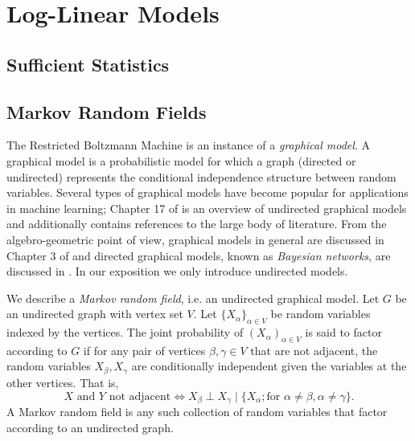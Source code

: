 \documentclass[cclicense]{hmcthesis}
\numberwithin{equation}{chapter}
\numberwithin{thmcounter}{chapter}
\begin{document}



\chapter{Log-Linear Models}

\section{Sufficient Statistics}

\section{Markov Random Fields}
    \label{sec:rbm-def}

    The Restricted Boltzmann Machine is an instance of a \emph{graphical model}.
    A graphical model is a probabilistic model for which a graph (directed or
    undirected) represents the conditional independence structure between random
    variables.  Several types of graphical models have become popular for
    applications in machine learning; Chapter 17 of \citep{EOSL} is an overview
    of undirected graphical models and additionally contains references to the
    large body of literature.  From the algebro-geometric point of view,
    graphical models in general are discussed in Chapter 3 of \citep{DSS08} and
    directed graphical models, known as \emph{Bayesian networks}, are discussed
    in \citep{GSS}.  In our exposition we only introduce undirected models.

    \begin{definition}
        We describe a \emph{Markov random field}, i.e. an undirected graphical
        model.  Let $G$ be an undirected graph with vertex set $V$.  Let
        $\{X_\alpha\}_{\alpha \in V}$ be random variables indexed by the
        vertices.  The joint probability of $(X_\alpha)_{\alpha \in V}$ is said
        to factor according to $G$ if for any pair of vertices $\beta, \gamma
        \in V$ that are not adjacent, the random variables $X_\beta, X_\gamma$
        are conditionally independent given the variables at the other vertices.
        That is,
        \[
            \text{$X$ and $Y$ not adjacent}
            \Longleftrightarrow
            X_\beta \perp X_\gamma \mid 
            \{X_\alpha; \text{for } \alpha \ne \beta, \alpha \ne \gamma\}.
        \]
        A Markov random field is any such collection of random variables that
        factor according to an undirected graph.
    \end{definition}
\end{document}
